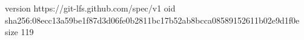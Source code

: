 version https://git-lfs.github.com/spec/v1
oid sha256:08ecc13a59be1f87d3d06fe0b2811bc17b52ab8bcca08589152611b02e9d1f0e
size 119
